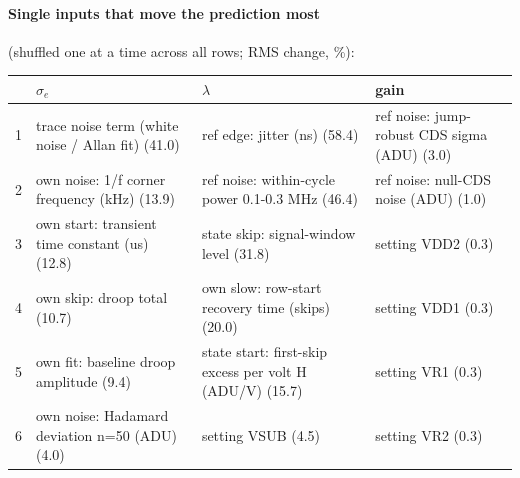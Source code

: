 \paragraph{Single inputs that move the prediction most} (shuffled one at a time across all rows; RMS change, \%):
\begin{center}\footnotesize
\begin{tabular}{rp{}p{}p{}}
\toprule
 & $\sigma_e$ & $\lambda$ & gain \\
\midrule
1 & trace noise term (white noise / Allan fit) (41.0) & ref edge: jitter (ns) (58.4) & ref noise: jump-robust CDS sigma (ADU) (3.0) \\
2 & own noise: 1/f corner frequency (kHz) (13.9) & ref noise: within-cycle power 0.1-0.3 MHz (46.4) & ref noise: null-CDS noise (ADU) (1.0) \\
3 & own start: transient time constant (us) (12.8) & state skip: signal-window level (31.8) & setting VDD2 (0.3) \\
4 & own skip: droop total (10.7) & own slow: row-start recovery time (skips) (20.0) & setting VDD1 (0.3) \\
5 & own fit: baseline droop amplitude (9.4) & state start: first-skip excess per volt H (ADU/V) (15.7) & setting VR1 (0.3) \\
6 & own noise: Hadamard deviation n=50 (ADU) (4.0) & setting VSUB (4.5) & setting VR2 (0.3) \\
\bottomrule
\end{tabular}
\end{center}
